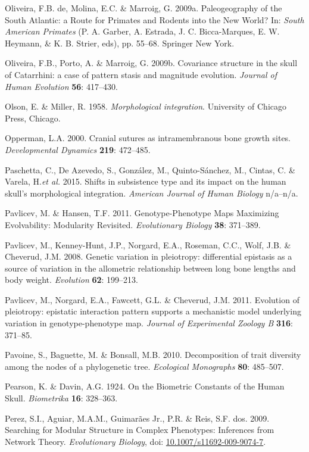 \documentclass[12pt,twoside]{report}
\begin{document}
Oliveira, F.B. de, Molina, E.C. \& Marroig, G. 2009a. Paleogeography of
the South Atlantic: a Route for Primates and Rodents into the New World?
In: \emph{South American Primates} (P. A. Garber, A. Estrada, J. C.
Bicca-Marques, E. W. Heymann, \& K. B. Strier, eds), pp. 55--68.
Springer New York.

Oliveira, F.B., Porto, A. \& Marroig, G. 2009b. Covariance structure in
the skull of Catarrhini: a case of pattern stasis and magnitude
evolution. \emph{Journal of Human Evolution} \textbf{56}: 417--430.

Olson, E. \& Miller, R. 1958. \emph{Morphological integration}.
University of Chicago Press, Chicago.

Opperman, L.A. 2000. Cranial sutures as intramembranous bone growth
sites. \emph{Developmental Dynamics} \textbf{219}: 472--485.

Paschetta, C., De Azevedo, S., González, M., Quinto-Sánchez, M., Cintas,
C. \& Varela, H.\emph{et al.} 2015. Shifts in subsistence type and its
impact on the human skull's morphological integration. \emph{American
Journal of Human Biology} n/a--n/a.

Pavlicev, M. \& Hansen, T.F. 2011. Genotype-Phenotype Maps Maximizing
Evolvability: Modularity Revisited. \emph{Evolutionary Biology}
\textbf{38}: 371--389.

Pavlicev, M., Kenney-Hunt, J.P., Norgard, E.A., Roseman, C.C., Wolf,
J.B. \& Cheverud, J.M. 2008. Genetic variation in pleiotropy:
differential epistasis as a source of variation in the allometric
relationship between long bone lengths and body weight. \emph{Evolution}
\textbf{62}: 199--213.

Pavlicev, M., Norgard, E.A., Fawcett, G.L. \& Cheverud, J.M. 2011.
Evolution of pleiotropy: epistatic interaction pattern supports a
mechanistic model underlying variation in genotype-phenotype map.
\emph{Journal of Experimental Zoology B} \textbf{316}: 371--85.

Pavoine, S., Baguette, M. \& Bonsall, M.B. 2010. Decomposition of trait
diversity among the nodes of a phylogenetic tree. \emph{Ecological
Monographs} \textbf{80}: 485--507.

Pearson, K. \& Davin, A.G. 1924. On the Biometric Constants of the Human
Skull. \emph{Biometrika} \textbf{16}: 328--363.

Perez, S.I., Aguiar, M.A.M., Guimarães Jr., P.R. \& Reis, S.F. dos.
2009. Searching for Modular Structure in Complex Phenotypes: Inferences
from Network Theory. \emph{Evolutionary Biology}, doi:
\href{http://dx.doi.org/10.1007/s11692-009-9074-7}{10.1007/s11692-009-9074-7}.
\end{document}

